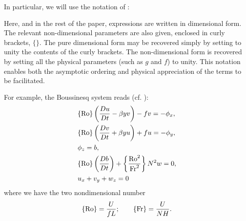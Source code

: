 In particular, we will use the notation of \cite{Vallis_96a}:
\begin{displayquote}
    Here, and in the rest of the paper, expressions are written in dimensional form. The relevant non-dimensional parameters are also given, enclosed in curly brackets, $\{\}$. The pure dimensional form may be recovered simply by setting to unity the contents of the curly brackets. The non-dimensional form is recovered by setting all the physical parameters (such as $g$ and $f$) to unity. This notation enables both the asymptotic ordering and physical appreciation of the terms to be facilitated.
\end{displayquote}
For example, the Boussinesq system reads (cf. \cite[(PE.1-4)]{Vallis_17}):
\begin{align}
    &\{\text{Ro}\}\left(\frac{Du}{Dt}-\beta y v\right)-fv = -\phi_x,\\
    &\{\text{Ro}\}\left(\frac{Dv}{Dt}+\beta y u\right)+fu = -\phi_y,\\
    &\phi_z = b,\\
    &\{\text{Ro}\}\left(\frac{Db}{Dt}\right)+\left\{\frac{\text{Ro}^2}{\text{Fr}^2}\right\} N^2w = 0,\\
    &u_x+v_y+w_z = 0
\end{align}
where we have the two nondimensional number
\begin{align}
    \{\text{Ro}\} = \frac{U}{fL};\qquad \{\text{Fr}\} = \frac{U}{NH}.
\end{align}